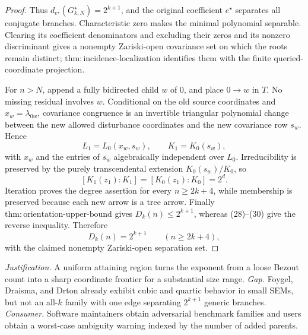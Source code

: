\documentclass{article}
\begin{document}
\begin{proof}
Thus \(d_{e^{\star}}(G^{\star}_{k,N})=2^{k+1}\), and the original coefficient \(e^{\star}\) separates all conjugate branches.  Characteristic zero makes the minimal polynomial separable.  Clearing its coefficient denominators and excluding their zeros and its nonzero discriminant gives a nonempty Zariski-open covariance set on which the roots remain distinct; \(\mathrm{thm:incidence\mbox{-}localization}\) identifies them with the finite queried-coordinate projection.

For \(n>N\), append a fully bidirected child \(w\) of \(0\), and place \(0\to w\) in \(T\).  No missing residual involves \(w\).  Conditional on the old source coordinates and \(x_w=\lambda_{0w}\), covariance congruence is an invertible triangular polynomial change between the new allowed disturbance coordinates and the new covariance row \(s_w\).  Hence
\[
 L_1=L_0(x_w,s_w),\qquad K_1=K_0(s_w),
\tag{29}
\]
with \(x_w\) and the entries of \(s_w\) algebraically independent over \(L_0\).  Irreducibility is preserved by the purely transcendental extension \(K_0(s_w)/K_0\), so
\[
 [K_1(z_1):K_1]=[K_0(z_1):K_0]=2^d.
\tag{30}
\]
Iteration proves the degree assertion for every \(n\ge2k+4\), while membership is preserved because each new arrow is a tree arrow.  Finally \(\mathrm{thm:orientation\mbox{-}upper\mbox{-}bound}\) gives \(D_k(n)\le2^{k+1}\), whereas (28)--(30) give the reverse inequality.  Therefore
\[
 D_k(n)=2^{k+1}\qquad(n\ge2k+4),
\]
with the claimed nonempty Zariski-open separation set.
\end{proof}
\par\smallskip\noindent \textit{Justification.} A uniform attaining region turns the exponent from a loose Bezout count into a sharp coordinate frontier for a substantial size range. \textit{Gap.} Foygel, Draisma, and Drton already exhibit cubic and quartic behavior in small SEMs, but not an all-\(k\) family with one edge separating \(2^{k+1}\) generic branches. \textit{Consumer.} Software maintainers obtain adversarial benchmark families and users obtain a worst-case ambiguity warning indexed by the number of added parents.
\end{document}
